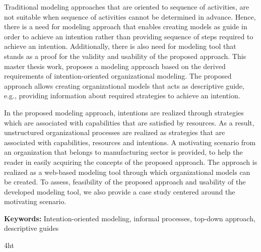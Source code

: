 \documentclass[
               fontsize=12pt, %
               paper=a4,
               twoside, %
               BCOR=3mm, %
               DIV=13,   %
               headinclude=true,
               footinclude=false,
               bibliography=totoc,
               headsepline,
               cleardoublepage=empty,
               parskip=half,
               pointlessnumbers, %
               final   %
               ]{scrbook}
\begin{document}
Traditional modeling approaches that are oriented to sequence of activities, are not suitable when sequence of activities cannot be determined in advance. Hence, there is a need for modeling approach that enables creating models as guide in order to achieve an intention rather than providing sequence of steps required to achieve an intention. Additionally, there is also need for modeling tool that stands as a proof for the validity and usability of the proposed approach. This master thesis work, proposes a modeling approach based on the derived requirements of intention-oriented organizational modeling. The proposed approach allows creating organizational models that acts as descriptive guide, e.g., providing information about required strategies to achieve an intention. 

In the proposed modeling approach, intentions are realized through strategies which are associated with capabilities that are satisfied by resources. As a result, unstructured organizational processes are realized as strategies that are associated with capabilities, resources and intentions. A motivating scenario from an organization that belongs to manufacturing sector is provided, to help the reader in easily acquiring the concepts of the proposed approach. The approach is realized as a web-based modeling tool through which organizational models can be created. To assess, feasibility of the proposed approach and usability of the developed modeling tool, we also provide a case study centered around the motivating scenario.  

\textbf{Keywords:} Intention-oriented modeling, informal processes, top-down approach, descriptive guides 


\iftex4ht
\else
{}
\fi

%
%

%
%
%
\end{document}
